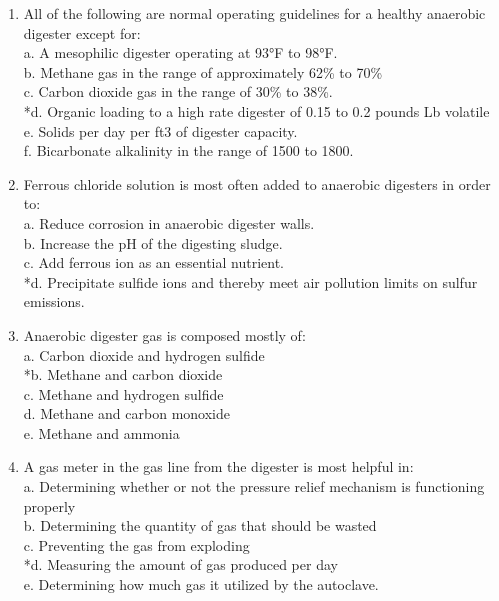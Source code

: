 \documentclass{article}
\begin{document}
\begin{enumerate}
\item  All of the following are normal operating guidelines for a healthy anaerobic digester except for: \\

a. A mesophilic digester operating at 93°F to 98°F. \\
b. Methane gas in the range of approximately 62\% to 70\% \\
c. Carbon dioxide gas in the range of 30\% to 38\%. \\
*d. Organic loading to a high rate digester of 0.15 to 0.2 pounds Lb volatile \\
e. Solids per day per ft3 of digester capacity. \\
f. Bicarbonate alkalinity in the range of 1500 to 1800. \\

\item  Ferrous chloride solution is most often added to anaerobic digesters in order to: \\

a. Reduce corrosion in anaerobic digester walls. \\
b. Increase the pH of the digesting sludge. \\
c. Add ferrous ion as an essential nutrient. \\
*d. Precipitate sulfide ions and thereby meet air pollution limits on sulfur emissions. \\

\item  Anaerobic digester gas is composed mostly of: \\

a. Carbon dioxide and hydrogen sulfide \\
*b. Methane and carbon dioxide \\
c. Methane and hydrogen sulfide \\
d. Methane and carbon monoxide \\
e. Methane and ammonia \\

\item  A gas meter in the gas line from the digester is most helpful in: \\

a. Determining whether or not the pressure relief mechanism is functioning properly \\
b. Determining the quantity of gas that should be wasted \\
c. Preventing the gas from exploding \\
*d. Measuring the amount of gas produced per day \\
e. Determining how much gas it utilized by the autoclave. \\


\end{enumerate}
\end{document}
